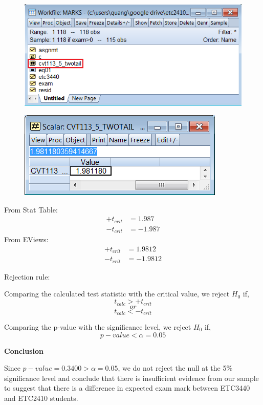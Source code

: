 \documentclass[12pt]{report}
\begin{document}
\vspace{-\baselineskip}
\begin{figure}[H]
	\centering
	\includegraphics{q1_13}
\end{figure}
\vspace{-\baselineskip}
\begin{figure}[H]
	\centering
	\includegraphics{q1_14}
\end{figure}
\vspace{-\baselineskip}
\noindent From Stat Table:
\begin{align*}
+t_{crit} &= 1.987 \\
-t_{crit} &= -1.987
\end{align*}
\noindent From EViews:
\begin{align*}
+t_{crit} &= 1.9812 \\
-t_{crit} &= -1.9812
\end{align*}

\noindent Rejection rule: 

\noindent Comparing the calculated test statistic with the critical value, we reject $H_0$ if,
$$t_{calc} > +t_{crit}$$
$$or$$
$$t_{calc} < -t_{crit}$$

\noindent Comparing the p-value with the significance level, we reject $H_0$ if,
$$p-value < \alpha = 0.05$$

\noindent \textbf{Conclusion}

\noindent Since $p-value = 0.3400 > \alpha = 0.05$, we do not reject the null at the 5\% significance level and conclude that there is insufficient evidence from our sample to suggest that there is a difference in expected exam mark between ETC3440 and ETC2410 students.
\end{document}

